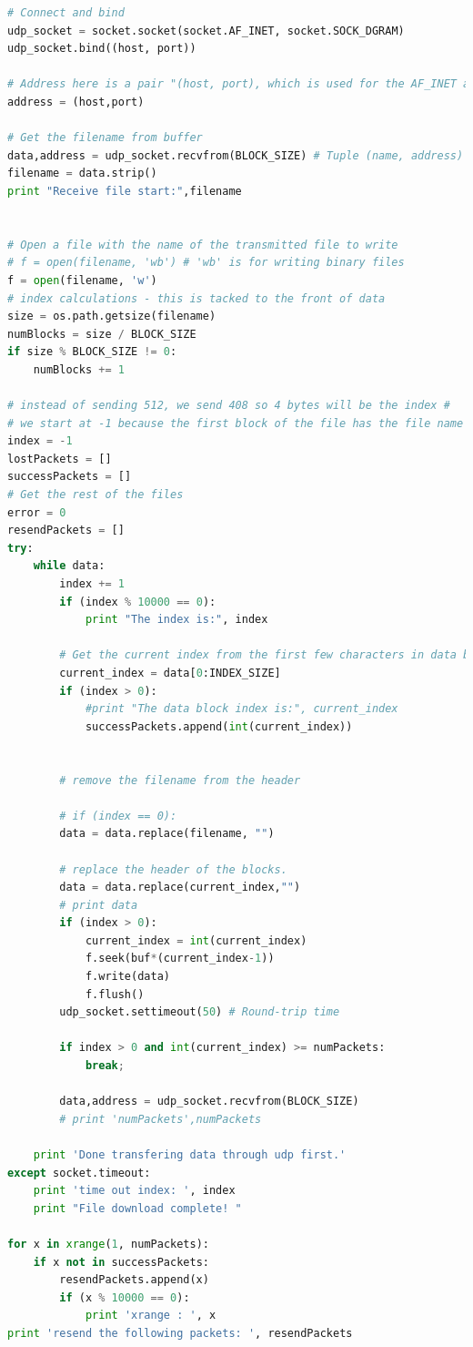 \documentclass[10pt]{article}
\begin{document}
\begin{lstlisting}[language=Python]
# Connect and bind
udp_socket = socket.socket(socket.AF_INET, socket.SOCK_DGRAM)
udp_socket.bind((host, port))

# Address here is a pair "(host, port), which is used for the AF_INET address family"
address = (host,port)

# Get the filename from buffer
data,address = udp_socket.recvfrom(BLOCK_SIZE) # Tuple (name, address)
filename = data.strip()
print "Receive file start:",filename


# Open a file with the name of the transmitted file to write
# f = open(filename, 'wb') # 'wb' is for writing binary files
f = open(filename, 'w')
# index calculations - this is tacked to the front of data
size = os.path.getsize(filename)
numBlocks = size / BLOCK_SIZE
if size % BLOCK_SIZE != 0:
	numBlocks += 1

# instead of sending 512, we send 408 so 4 bytes will be the index #
# we start at -1 because the first block of the file has the file name in it
index = -1
lostPackets = []
successPackets = []
# Get the rest of the files
error = 0
resendPackets = []
try:
	while data:
		index += 1
		if (index % 10000 == 0):
			print "The index is:", index

		# Get the current index from the first few characters in data block
		current_index = data[0:INDEX_SIZE]
		if (index > 0):
			#print "The data block index is:", current_index
			successPackets.append(int(current_index))


		# remove the filename from the header

		# if (index == 0):
		data = data.replace(filename, "")

		# replace the header of the blocks.
		data = data.replace(current_index,"")
		# print data
		if (index > 0):
			current_index = int(current_index)
			f.seek(buf*(current_index-1))
			f.write(data)
			f.flush()
		udp_socket.settimeout(50) # Round-trip time

		if index > 0 and int(current_index) >= numPackets:
			break;

		data,address = udp_socket.recvfrom(BLOCK_SIZE)
		# print 'numPackets',numPackets

	print 'Done transfering data through udp first.'
except socket.timeout:
	print 'time out index: ', index
	print "File download complete! "

for x in xrange(1, numPackets):
	if x not in successPackets:
		resendPackets.append(x)
		if (x % 10000 == 0):
			print 'xrange : ', x
print 'resend the following packets: ', resendPackets


\end{lstlisting}
\end{document}
